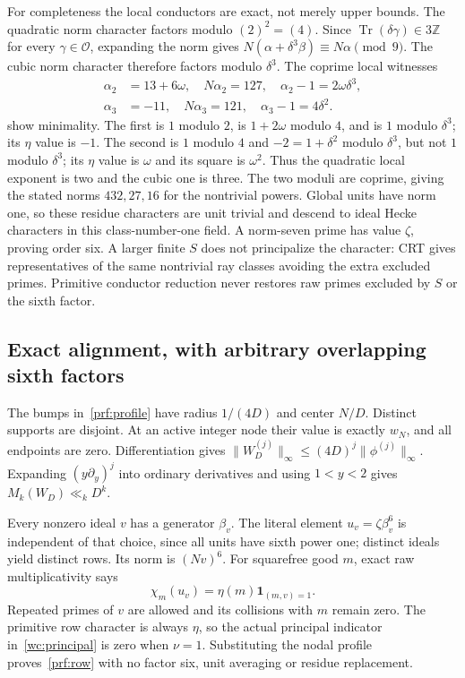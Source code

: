 For completeness the local conductors are exact, not merely upper bounds.
The quadratic norm character factors modulo $(2)^2=(4)$.
Since $\operatorname{Tr}(\delta\gamma)\in3\mathbb Z$ for every
$\gamma\in\mathcal O$, expanding the norm gives
$N(\alpha+\delta^3\beta)\equiv N\alpha\pmod9$.
The cubic norm character therefore factors modulo $\delta^3$.
The coprime local witnesses
\begin{align*}
 \alpha_2&=13+6\omega,\quad N\alpha_2=127,\quad
 \alpha_2-1=2\omega\delta^3,\\
 \alpha_3&=-11,\quad N\alpha_3=121,\quad
 \alpha_3-1=4\delta^2.
\end{align*}
show minimality. The first is $1$ modulo $2$, is $1+2\omega$ modulo $4$,
and is $1$ modulo $\delta^3$; its $\eta$ value is $-1$.
The second is $1$ modulo $4$ and $-2=1+\delta^2$ modulo $\delta^3$,
but not $1$ modulo $\delta^3$; its $\eta$ value is $\omega$ and its square
is $\omega^2$. Thus the quadratic local exponent is two and the cubic
one is three. The two moduli are coprime, giving the stated norms
$432,27,16$ for the nontrivial powers. Global units have norm one, so
these residue characters are unit trivial and descend to ideal Hecke
characters in this class-number-one field. A norm-seven prime has value
$\zeta$, proving order six. A larger finite $S$ does not principalize the
character: CRT gives representatives of the same nontrivial ray classes
avoiding the extra excluded primes. Primitive conductor reduction never
restores raw primes excluded by $S$ or the sixth factor.

\subsection{Exact alignment, with arbitrary overlapping sixth factors}
The bumps in~\eqref{prf:profile} have radius $1/(4D)$ and center $N/D$.
Distinct supports are disjoint. At an active integer node their value is
exactly $w_N$, and all endpoints are zero. Differentiation gives
$\|W_D^{(j)}\|_\infty\le(4D)^j\|\phi^{(j)}\|_\infty$.
Expanding $(y\partial_y)^j$ into ordinary derivatives and using $1<y<2$
gives $M_k(W_D)\ll_kD^k$.

Every nonzero ideal $v$ has a generator $\beta_v$. The literal element
$u_v=\zeta\beta_v^6$ is independent of that choice, since all units have
sixth power one; distinct ideals yield distinct rows. Its norm is $(Nv)^6$.
For squarefree good $m$, exact raw multiplicativity says
\[
 \chi_m(u_v)=\eta(m)\mathbf1_{(m,v)=1}.
\]
Repeated primes of $v$ are allowed and its collisions with $m$ remain
zero. The primitive row character is always $\eta$, so the actual
principal indicator in~\eqref{wc:principal} is zero when $\nu=1$.
Substituting the nodal profile proves~\eqref{prf:row} with no factor six,
unit averaging or residue replacement.

